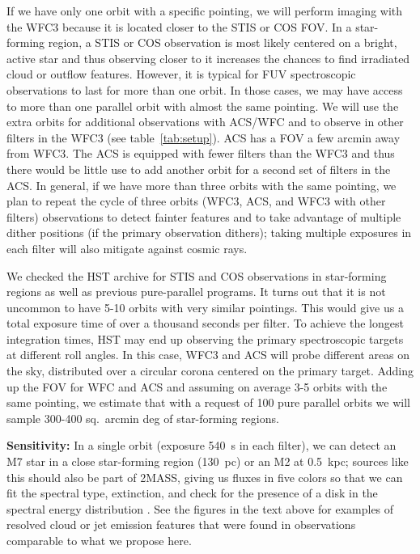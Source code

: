 \documentclass[12pt]{article}
\begin{document}
If we have only one orbit with a specific pointing, we will perform imaging with the WFC3 because it is located closer to the STIS or COS FOV. In a star-forming region, a STIS or COS observation is most likely centered on a bright, active star and thus observing closer to it increases the chances to find irradiated cloud or outflow features. However,
it is typical for FUV spectroscopic observations to last for more than one orbit. In those cases, we may have access to more than one parallel orbit with almost the same pointing. We will use the extra orbits for additional observations with ACS/WFC and to observe in other filters in the WFC3 (see table~\ref{tab:setup}). ACS has a FOV a few arcmin away from WFC3. The ACS is equipped with fewer filters than the WFC3 and thus there would be little use to add another orbit for a second set of filters in the ACS.
In general, if we have more than three orbits with the same pointing, we plan to repeat the cycle of three orbits (WFC3, ACS, and WFC3 with other filters) observations to detect fainter features and to take advantage of multiple dither positions (if the primary observation dithers); taking multiple exposures in each filter will also mitigate against cosmic rays. 

We checked the HST archive for STIS and COS observations in star-forming regions as well as previous pure-parallel programs. It turns out that it is not uncommon to have 5-10 orbits with very similar pointings. This would give us a total exposure time of over a thousand seconds per filter. To achieve the longest integration times, HST may end up observing the primary spectroscopic targets at different roll angles. In this case, WFC3 and ACS will probe different areas on the sky, distributed over a circular corona centered on the primary target. Adding up the FOV for WFC and ACS and assuming on average 3-5 orbits with the same pointing, we estimate that with a request of 100 pure parallel orbits we will sample 300-400 sq.\ arcmin deg of star-forming regions.

\textbf{Sensitivity:} In a single orbit (exposure 540~s in each filter), we can detect an M7 star in a close star-forming region (130~pc) or an M2 at 0.5~kpc; sources like this should also be part of 2MASS, giving us fluxes in five colors so that we can fit the spectral type, extinction, and check for the presence of a disk in the spectral energy distribution \citep[SED, using models from][]{2007ApJS..169..328R}.
See the figures in the text above for examples of resolved cloud or jet emission features that were found in observations comparable to what we propose here.
\end{document}
